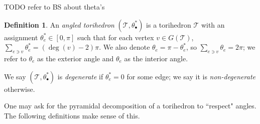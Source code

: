 \documentclass[11pt]{amsart}
\newcommand{\comment}[1]{}
\newcommand{\torus}{{\mathbb{T}^2}}
\newcommand{\sT}{{\mathcal{T}}}
\theoremstyle{plain}
\theoremstyle{definition}
\newtheorem{definition}[theorem]{Definition}
\newtheorem{remark}[theorem]{Remark}
\begin{document}
\comment{
\begin{remark}\label{cor:triangulation}
The faces of one torihedron which do not correspond to a bow-tie glue to a
corresponding face of the second torihedron to form bipyramids. One can add
stellating edges, edges which have vertices corresponding to the different
components of the Hopf link that cuts through the center of the face to
decompose the bipyramids into tetrahedra. This process is called {\it
stellation}. Stellating all the bipyramids of the decomposition obtained from
Proposition \ref{p:tori_decomp} we obtained a triangulation of the
complement of $L$ which is made up of {\it horizontal} edges (edges from the
graph of the torihedra), {\it vertical} edges (edges from coning vertices of the
the graph of the torihedra) and stellating edges.
\end{remark}
}

\comment{
\begin{proof}[Proof of Remark 2.7]
Using the decomposition from Proposition
\ref{p:tori_decomp} we can add a stellation edge whose end points
are $\torus \times \{-1\}$ and $\torus \times \{1\}$ which cut through faces of $\torus \times I$ which do not come from the augmentation disks like in \cite{CKP2}.
Since each face of the top torihedron gets glued to the bottom torihedron, we
obtain bipyramids, and the stellation edge will decompose the bipyramids into
tetrahedra. Then the link of the vertex  $\torus \times \{1\}$ or
$\torus \times \{-1\}$ is the graph of the torihedron
\end{proof}
}


TODO refer to BS about theta's
\begin{definition}
An \emph{angled torihedron} $(\sT, \theta_\bullet^*)$
is a torihedron $\sT$ with
an assignment $\theta_e^* \in [0,\pi]$
such that for each vertex $v \in G(\sT)$,
$\sum_{e \ni v} \theta_e^* = (\deg(v) - 2)\pi$.
We also denote $\theta_e = \pi - \theta_e^*$,
so $\sum_{e \ni v} \theta_e = 2\pi$;
we refer to $\theta_e$ as the exterior angle
and $\theta_e$ as the interior angle.


We say $(\sT, \theta_\bullet^*)$ is \emph{degenerate}
if $\theta_e^* = 0$ for some edge;
we say it is \emph{non-degenerate} otherwise.
\end{definition}


One may ask for the pyramidal decomposition of a torihedron
to ``respect" angles. The following definitions make sense of this.
\end{document}
